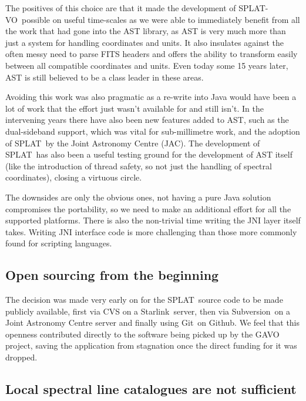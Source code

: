 \documentclass[final,authoryear,5p,times,twocolumn]{elsarticle}
\newcommand{\splat}{\textsf{\small SPLAT}}
\newcommand{\splatvo}{{\textsf{\small{SPLAT-VO}}}}
\newcommand{\Starlink}{\textsf{\small Starlink}}
\newcommand{\subversion}{\textsf{\small Subversion}}
\newcommand{\git}{\textsf{\small Git}}
\begin{document}
The positives of this choice are that it made the development of \splatvo\
possible on useful time-scales as we were able to immediately benefit from all
the work that had gone into the AST library, as AST is very much more than just
a system for handling coordinates and units. It also insulates against the
often messy need to parse FITS headers and offers the ability to transform
easily between all compatible coordinates and units. Even today some 15 years
later, AST is still believed to be a class leader in these areas.

Avoiding this work was also pragmatic as a re-write into Java would have been a
lot of work that the effort just wasn't available for and still isn't. In the
intervening years there have also been new features added to AST, such as the
dual-sideband support, which was vital for sub-millimetre work, and the
adoption of \splat\ by the Joint Astronomy Centre (JAC). The development of
\splat\ has also been a useful testing ground for the development of AST itself
(like the introduction of thread safety, so not just the handling of spectral
coordinates), closing a virtuous circle.

The downsides are only the obvious ones, not having a pure Java solution
compromises the portability, so we need to make an additional effort for all
the supported platforms. There is also the non-trivial time writing the JNI
layer itself takes. Writing JNI interface code is more challenging than those
more commonly found for scripting languages.

\subsection{Open sourcing from the beginning}

The decision was made very early on for the \splat\ source code to be made
publicly available, first via CVS on a \Starlink\ server, then via \subversion\
on a Joint Astronomy Centre server and finally using \git\ on Github. We feel
that this openness contributed directly to the software being picked up by the
GAVO project, saving the application from stagnation once the direct funding
for it was dropped.

\subsection{Local spectral line catalogues are not sufficient}
\end{document}
